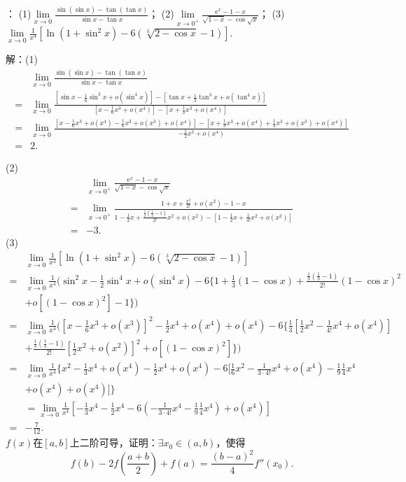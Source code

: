 \documentclass[12pt,UTF8]{ctexart}
\begin{document}
\begin{enumerate}
：
\newline
(1)$\lim\limits_{x\rightarrow0}\frac{\sin(\sin x)-\tan(\tan x)}{\sin x-\tan x}$；
\newline
(2)$\lim\limits_{x\rightarrow0^+}\frac{\mathrm e^x-1-x}{\sqrt{1-x}-\cos\sqrt x}$；
\newline
(3)$\lim\limits_{x\rightarrow0}\frac1{x^4}[\ln(1+\sin^2x)-6(\sqrt[3]{2-\cos x}-1)]$.

解：(1)\[\begin{split}
&\lim\limits_{x\rightarrow0}\frac{\sin(\sin x)-\tan(\tan x)}{\sin x-\tan x}\\
=&\lim\limits_{x\rightarrow0}\frac{[\sin x-\frac16\sin^3x+o(\sin^4x)]-[\tan x+\frac13\tan^3x+o(\tan^4x)]}{[x-\frac16x^3+o(x^4)]-[x+\frac13x^3+o(x^4)]}\\
=&\lim\limits_{x\rightarrow0}\frac{[x-\frac16x^3+o(x^4)-\frac16x^3+o(x^3)+o(x^4)]-[x+\frac13x^3+o(x^4)+\frac13x^3+o(x^3)+o(x^4)]}{-\frac12x^3+o(x^4)}\\
=&2.
\end{split}\]

(2)\[\begin{split}
&\lim\limits_{x\rightarrow0^+}\frac{\mathrm e^x-1-x}{\sqrt{1-x}-\cos\sqrt x}\\
=&\lim\limits_{x\rightarrow0^+}\frac{1+x+\frac{x^2}{2!}+o(x^2)-1-x}{1-\frac12x+\frac{\frac12(\frac12-1)}{2!}x^2+o(x^2)-[1-\frac12x+\frac1{4!}x^2+o(x^2)]}\\
=&-3.
\end{split}\]
(3)\[\begin{split}
&\lim\limits_{x\rightarrow0}\frac1{x^4}[\ln(1+\sin^2x)-6(\sqrt[3]{2-\cos x}-1)]\\
=&\lim\limits_{x\rightarrow0}\frac1{x^4}(\sin^2x-\frac12\sin^4x+o(\sin^4x)-6\{1+\frac13(1-\cos x)+\frac{\frac13(\frac13-1)}{2!}(1-\cos x)^2\\
&+o[(1-\cos x)^2]-1\})\\
=&\lim\limits_{x\rightarrow0}\frac1{x^4}([x-\frac16x^3+o(x^3)]^2-\frac12x^4+o(x^4)+o(x^4)-6\{\frac13[\frac12x^2-\frac1{4!}x^4+o(x^4)]\\
&+\frac{\frac13(\frac13-1)}{2!}[\frac12x^2+o(x^2)]^2+o[(1-\cos x)^2]\})\\
=&\lim\limits_{x\rightarrow0}\frac1{x^4}\{x^2-\frac13x^4+o(x^4)-\frac12x^4+o(x^4)-6[\frac16x^2-\frac1{3\cdot4!}x^4+o(x^4)-\frac19\frac14x^4\\
&+o(x^4)+o(x^4)]\}\\
&=\lim\limits_{x\rightarrow0}\frac1{x^4}[-\frac13x^4-\frac12x^4-6(-\frac1{3\cdot4!}x^4-\frac19\frac14x^4)+o(x^4)]\\
=&-\frac7{12}.
\end{split}\]
$f(x)$在$[a,b]$上二阶可导，证明：$\exists x_0\in(a,b)$，使得
\[
f(b)-2f(\frac{a+b}2)+f(a)=\frac{(b-a)^2}4f''(x_0).
\]


\end{enumerate}
\end{document}
